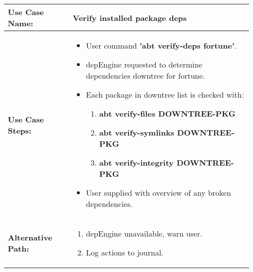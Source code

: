 \medskip

\begin{tabularx}{\linewidth}{|l|X|}
\hline
\textbf{Use Case Name:} & \textbf{Verify installed package deps} \\
\hline
\textbf{Use Case Steps:} & 
\begin{minipage}{\linewidth} 
  \vspace{0.05em}
  \begin{itemize}
    \item User command \textbf{'abt verify-deps fortune'}.
    \item depEngine requested to determine dependencies downtree for fortune.
    \item Each package in downtree list is checked with:
    \begin{enumerate}
      \item \textbf{abt verify-files DOWNTREE-PKG}
      \item \textbf{abt verify-symlinks DOWNTREE-PKG}
      \item \textbf{abt verify-integrity DOWNTREE-PKG}
    \end{enumerate}
    \item User supplied with overview of any broken dependencies.
  \end{itemize}
  \vspace{0.05em}
\end{minipage}
\\
\hline 
\textbf{Alternative Path:} &
\begin{minipage}{\linewidth}
  \vspace{0.05em} 
  \begin{enumerate}
    \item depEngine unavailable, warn user.
    \item Log actions to journal.
  \end{enumerate}
  \vspace{0.05em} 
\end{minipage}
\\
\hline
\end{tabularx}